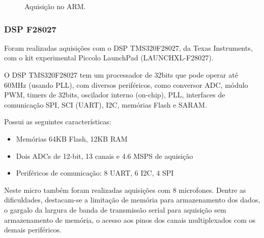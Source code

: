 \documentclass[a4paper,oneside,12pt]{article}
\begin{document}
\begin{figure}
\centering
{}
\caption{Aquisição no ARM.}\label{fig:arm2}
\end{figure}

\subsubsection{DSP F28027}

Foram realizadas aquisições com o DSP TMS320F28027, da Texas Instruments, com o kit experimental Piccolo LaunchPad (LAUNCHXL-F28027).

O DSP TMS320F28027 tem um processador de 32bits que pode operar até 60MHz (usando PLL), com diversos periféricos, como conversor ADC, módulo PWM, timers de 32bits, oscilador interno (on-chip), PLL, interfaces de comunicação SPI, SCI (UART), I2C, memórias Flash e SARAM.

Possui as seguintes características:

\begin{itemize}
\item Memórias 64KB Flash, 12KB RAM
\item Dois ADCs de 12-bit, 13 canais e 4.6 MSPS de aquisição
\item Periféricos de comunicação: 8 UART, 6 I2C, 4 SPI
\end{itemize}

Neste micro também foram realizadas aquisições com 8 microfones. Dentre as dificuldades, destacam-se a limitação de memória para armazenamento dos dados, o gargalo da largura de banda de transmissão serial para aquisição sem armazenamento de memória, o acesso aos pinos dos canais multiplexados com os demais periféricos.
\end{document}
